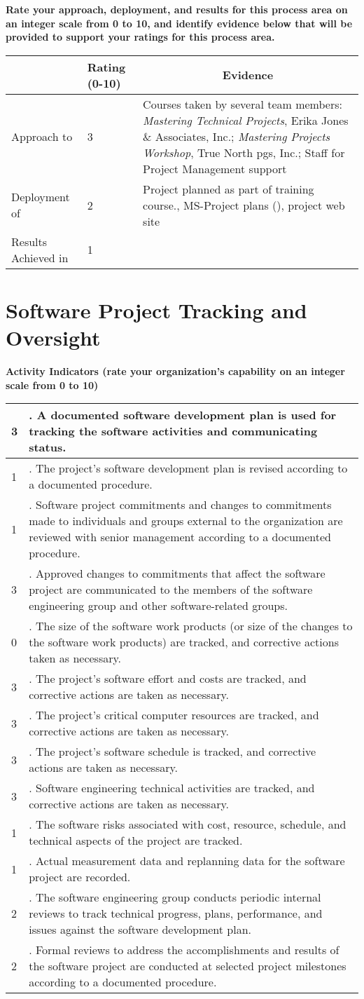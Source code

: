 \documentclass{article}
\newcommand{\KPAname}{}
\let\KPAsection=\section
\renewcommand{\section}[1]{\renewcommand{\KPAname}{#1}\KPAsection{#1}}
\newcounter{activity}		%
\newenvironment{KPAActivity}
{
    \setcounter{activity}{0} %
    {\bf Activity Indicators (rate your organization's capability
    on an integer scale from 0 to 10)} %
    \begin{center}
    \begin{tabular}{|p{0.5in}|p{6.0in}|} \hline %
}
{
    \end{tabular}
    \end{center}
}
\newcommand{\Activity}[2]
{
    \stepcounter{activity} #1 & \arabic{activity}. #2 \\ \hline
} %
\newenvironment{KPARate}
{
    {\bf Rate your approach, deployment, and results for
    this process area on an integer scale from 0 to 10, and 
    identify evidence below that will be provided to support your
    ratings for this process area.}
    \begin{center}
    \begin{tabular}{|p{1.0in}|p{0.5in}|p{5.0in}|} \hline
    & Rating (0-10) & \multicolumn{1}{c|}{Evidence} \\ \hline
}
{
    \end{tabular}
    \end{center}
}
\newcommand{\Approach}[2]{Approach to \KPAname & #1 & #2 \\ \hline}
\newcommand{\Deployment}[2]{Deployment of \KPAname & #1 & #2 \\ \hline}
\newcommand{\Results}[2]{Results Achieved in \KPAname & #1 & #2 \\
	\hline}
\begin{document}
\begin{KPARate}
\Approach{3}{Courses taken by several team members: 
             {\em Mastering Technical Projects}, Erika Jones \&
             Associates, Inc.;  
             {\em Mastering Projects Workshop}, True North pgs, Inc.;
             Staff for Project Management support}
\Deployment{2}{Project planned as part of training course., MS-Project
             plans (), project web site}
\Results{1}{}
\end{KPARate}

\newpage
\section{Software Project Tracking and Oversight}

\begin{KPAActivity}
\Activity{3}{A documented software development plan is used for
tracking the software activities and communicating status.}
\Activity{1}{The project's software development plan is revised
according to a documented procedure.}
\Activity{1}{Software project commitments and changes to
commitments made to individuals and groups external to the
organization are reviewed with senior management according to a
documented procedure.}
\Activity{3}{Approved changes to commitments that affect the
software project are communicated to the members of the software
engineering group and other software-related groups.}
\Activity{0}{The size of the software work products (or size of the
changes to the software work products) are tracked, and corrective
actions taken as necessary.}
\Activity{3}{The project's software effort and costs are tracked,
and corrective actions are taken as necessary.}
\Activity{3}{The project's critical computer resources are tracked,
and corrective actions are taken as necessary.}
\Activity{3}{The project's software schedule is tracked, and
corrective actions are taken as necessary.}
\Activity{3}{Software engineering technical activities are tracked,
and corrective actions are taken as necessary.}
\Activity{1}{The software risks associated with cost, resource,
schedule, and technical aspects of the project are tracked.}
\Activity{1}{Actual measurement data and replanning data for the
software project are recorded.}
\Activity{2}{The software engineering group conducts periodic
internal reviews to track technical progress, plans, performance, and
issues against the software development plan.}
\Activity{2}{Formal reviews to address the accomplishments and
results of the software project are conducted at selected project
milestones according to a documented procedure.} 
\end{KPAActivity}
\end{document}
